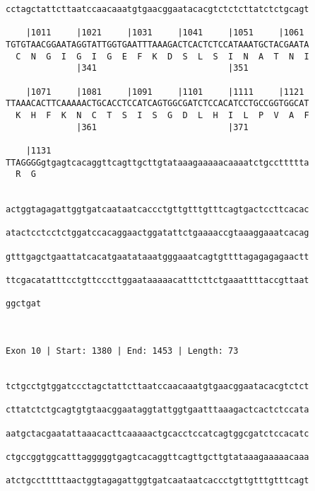 \documentclass{article}
\begin{document}
\begin{Verbatim}
cctagctattcttaatccaacaaatgtgaacggaatacacgtctctcttatctctgcagt
                                                            
    |1011     |1021     |1031     |1041     |1051     |1061 
TGTGTAACGGAATAGGTATTGGTGAATTTAAAGACTCACTCTCCATAAATGCTACGAATA
  C  N  G  I  G  I  G  E  F  K  D  S  L  S  I  N  A  T  N  I
              |341                          |351            
  
    |1071     |1081     |1091     |1101     |1111     |1121 
TTAAACACTTCAAAAACTGCACCTCCATCAGTGGCGATCTCCACATCCTGCCGGTGGCAT
  K  H  F  K  N  C  T  S  I  S  G  D  L  H  I  L  P  V  A  F
              |361                          |371            
  
    |1131                                                   
TTAGGGGgtgagtcacaggttcagttgcttgtataaagaaaaacaaaatctgccttttta
  R  G                                                      
                                                            
  
actggtagagattggtgatcaataatcaccctgttgtttgtttcagtgactccttcacac
                                                            
atactcctcctctggatccacaggaactggatattctgaaaaccgtaaaggaaatcacag
                                                            
gtttgagctgaattatcacatgaatataaatgggaaatcagtgttttagagagagaactt
                                                            
ttcgacatatttcctgttcccttggaataaaaacatttcttctgaaattttaccgttaat
                                                            
ggctgat
       
       
 
Exon 10 | Start: 1380 | End: 1453 | Length: 73


tctgcctgtggatccctagctattcttaatccaacaaatgtgaacggaatacacgtctct
                                                            
cttatctctgcagtgtgtaacggaataggtattggtgaatttaaagactcactctccata
                                                            
aatgctacgaatattaaacacttcaaaaactgcacctccatcagtggcgatctccacatc
                                                            
ctgccggtggcatttagggggtgagtcacaggttcagttgcttgtataaagaaaaacaaa
                                                            
atctgcctttttaactggtagagattggtgatcaataatcaccctgttgtttgtttcagt
                                                            

\end{Verbatim}
\end{document}
